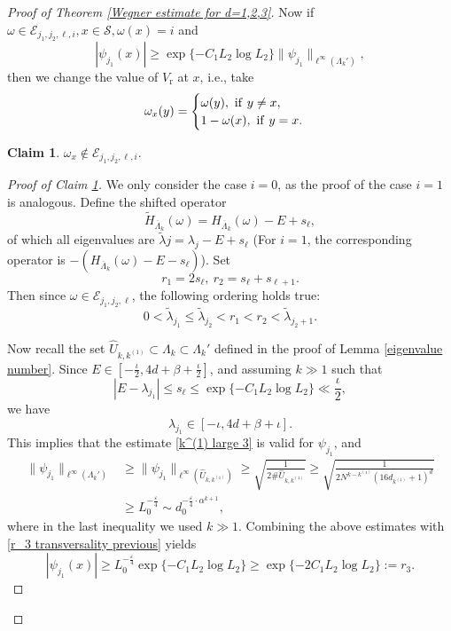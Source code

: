 \documentclass[11pt,reqno,UTF8,twoside]{amsart}
\newcommand{\barLambda}{\overline{\Lambda}}
\newcommand{\mcE}{\mathcal{E}}
\newcommand{\mcS}{\mathcal{S}}
\newcommand{\wtlambda}{\widetilde{\lambda}}
\theoremstyle{definition}
\newtheorem{claim}[thm]{\bf Claim}
\numberwithin{equation}{section}
\begin{document}
\begin{proof}[Proof of Theorem \ref{Wegner estimate for d=1,2,3}]
Now if $\omega\in \mcE_{j_1,j_2,\ell,i}, x\in \mcS, \omega(x)=i$ and 
\begin{equation}\label{r_3 transversality previous}
  |\psi_{j_1}(x)|\geq \exp\{-C_1L_2\log L_2\}\|\psi_{j_1}\|_{\ell^{\infty}(\Lambda_k')}, 
\end{equation}
then we change the value of $V_{\text{r}}$ at $x$, i.e.,  take 
\begin{equation*}
  \omega_x(y)=\begin{cases}
    \omega(y), \ {\rm if} \ y \neq x,\\
    1-\omega(x), \ {\rm if} \ y=x.
  \end{cases}
\end{equation*}

\begin{claim}\label{Sperner structure}
  $\omega_x\notin \mcE_{j_1,j_2,\ell,i}.$
\end{claim}
\begin{proof}[Proof of Claim \ref{Sperner structure}]
We only consider the case $i=0$, as the proof  of   the case $i=1$ is analogous. Define the shifted operator
\[\widetilde{H}_{\barLambda_k}(\omega)=H_{\barLambda_k}(\omega)-E+s_\ell,\]
of which all eigenvalues are $\widetilde{\lambda}j=\lambda_j-E+s_{\ell}$ (For $i=1$, the corresponding operator is $-(H_{\barLambda_k}(\omega)-E-s_{\ell})$).  Set
\begin{equation}\label{r_1,r_2}
  r_1=2s_\ell,\ r_2=s_{\ell}+s_{\ell+1}.
\end{equation}
Then since $\omega\in \mcE_{j_1,j_2,\ell}$,  the following ordering holds true:
\[0<\widetilde{\lambda}_{j_1}\leq \wtlambda_{j_2}<r_1<r_2<\wtlambda_{j_2+1}.\]


Now recall the set $\widehat{U}_{k,k^{(1)}}\subset\Lambda_k \subset \Lambda_k'$ defined in the proof of Lemma \ref{eigenvalue number}. 
Since $E \in [-\frac{\iota}{2}, 4d+\beta+\frac{\iota}{2}]$, and assuming $k\gg1$ such that 
\[|E-\lambda_{j_1}|\leq s_{\ell} \leq \exp\{-C_1L_2\log L_2\}\ll \frac{\iota}{2}, \]
we have
\begin{equation}\label{lambda still less than h}
  \lambda_{j_1}\in [-\iota,4d+\beta+\iota].
\end{equation}
This implies that the estimate \eqref{k^(1) large 3} is valid for $\psi_{j_1}$, and
\begin{align*}
  \|\psi_{j_1}\|_{\ell^{\infty}(\Lambda_k')} & \geq \|\psi_{j_1}\|_{\ell^{\infty}(\widehat{U}_{k,k^{(1)}})} \geq \sqrt{\frac{1}{2 \# \widehat{U}_{k,k^{(1)}}}} \geq \sqrt{\frac{1}{2 N^{k-k^{(1)}} (16d_{k^{(1)}}+1)^d}} \\
    &\geq L_0^{-\frac{\varepsilon}{4}}\sim d_{0} ^{-\frac{\varepsilon}{4}\cdot \alpha ^{k+1}},
\end{align*}
where in  the last inequality  we used  $k\gg1$. Combining the above estimates  with \eqref{r_3 transversality previous} yields
\begin{equation}\label{r_3 transversality}
  |\psi_{j_1}(x)|\geq  L_0^{-\frac{\varepsilon}{4}} \exp\{-C_1L_2\log L_2\} \geq \exp\{-2C_1L_2\log L_2\}:= r_3.
\end{equation}



\end{proof}
\end{proof}
\end{document}
